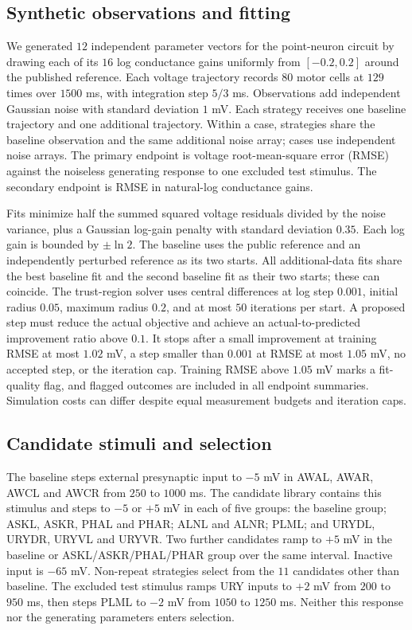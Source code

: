 \documentclass[11pt,letterpaper]{article}
\begin{document}
\subsection{Synthetic observations and fitting}
We generated $12$ independent parameter vectors for the point-neuron circuit by drawing each of its $16$ log conductance gains uniformly from $[-0.2,0.2]$ around the published reference. Each voltage trajectory records $80$ motor cells at $129$ times over $1500$ ms, with integration step $5/3$ ms. Observations add independent Gaussian noise with standard deviation $1$ mV. Each strategy receives one baseline trajectory and one additional trajectory. Within a case, strategies share the baseline observation and the same additional noise array; cases use independent noise arrays. The primary endpoint is voltage root-mean-square error (RMSE) against the noiseless generating response to one excluded test stimulus. The secondary endpoint is RMSE in natural-log conductance gains.

Fits minimize half the summed squared voltage residuals divided by the noise variance, plus a Gaussian log-gain penalty with standard deviation $0.35$. Each log gain is bounded by $\pm\ln 2$. The baseline uses the public reference and an independently perturbed reference as its two starts. All additional-data fits share the best baseline fit and the second baseline fit as their two starts; these can coincide. The trust-region solver uses central differences at log step $0.001$, initial radius $0.05$, maximum radius $0.2$, and at most $50$ iterations per start. A proposed step must reduce the actual objective and achieve an actual-to-predicted improvement ratio above $0.1$. It stops after a small improvement at training RMSE at most $1.02$ mV, a step smaller than $0.001$ at RMSE at most $1.05$ mV, no accepted step, or the iteration cap. Training RMSE above $1.05$ mV marks a fit-quality flag, and flagged outcomes are included in all endpoint summaries. Simulation costs can differ despite equal measurement budgets and iteration caps.

\subsection{Candidate stimuli and selection}
The baseline steps external presynaptic input to $-5$ mV in AWAL, AWAR, AWCL and AWCR from $250$ to $1000$ ms. The candidate library contains this stimulus and steps to $-5$ or $+5$ mV in each of five groups: the baseline group; ASKL, ASKR, PHAL and PHAR; ALNL and ALNR; PLML; and URYDL, URYDR, URYVL and URYVR. Two further candidates ramp to $+5$ mV in the baseline or ASKL/ASKR/PHAL/PHAR group over the same interval. Inactive input is $-65$ mV. Non-repeat strategies select from the $11$ candidates other than baseline. The excluded test stimulus ramps URY inputs to $+2$ mV from $200$ to $950$ ms, then steps PLML to $-2$ mV from $1050$ to $1250$ ms. Neither this response nor the generating parameters enters selection.
\end{document}
